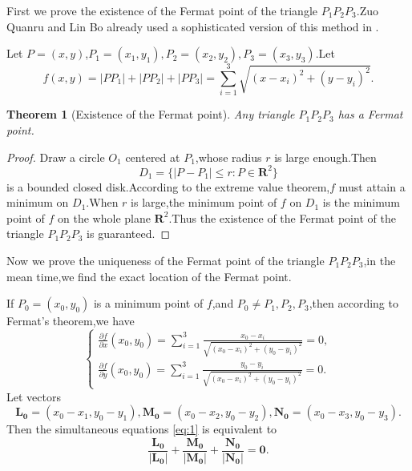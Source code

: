 \documentclass{amsart}
\theoremstyle{plain}
\newtheorem{theorem}{Theorem}
\theoremstyle{definition}
\begin{document}
First we prove the existence of the Fermat point of the triangle
$P_1P_2P_3$.Zuo Quanru and Lin Bo already used a
sophisticated version of this method in \cite{zuo}.

Let $P=(x,y)$,$P_1=(x_1,y_1),P_2=(x_2,y_2),P_3=(x_3,y_3)$.Let 
\begin{equation*}
  f(x,y)=|PP_1|+|PP_2|+|PP_3|=\sum_{i=1}^3\sqrt{(x-x_i)^2+(y-y_i)^2}.
\end{equation*}


\begin{theorem}[Existence of the Fermat point]\label{theorem:3}
  Any triangle $P_1P_2P_3$ has a Fermat point.
\end{theorem}
\begin{proof}
Draw a circle $O_1$ centered at $P_1$,whose radius $r$ is large
enough.Then $$D_{1}=\{|P-P_1|\leq r:P\in \mathbf{R}^2\}$$ is a bounded
closed disk.According to the extreme value theorem,$f$ must
attain a minimum on $D_1$.When $r$ is large,the minimum point of $f$ on
$D_1$ is the minimum point of $f$ on the whole plane $\mathbf{R}^2$.Thus the existence of the Fermat
point of the triangle $P_1P_2P_3$ is guaranteed.
\end{proof}





Now we prove the uniqueness of the Fermat point of the triangle
$P_1P_2P_3$,in the mean time,we find the exact
location of the Fermat point.




If $P_0=(x_0,y_0)$ is a minimum point of $f$,and $P_0\neq P_1,P_2,P_3$,then
according to Fermat's theorem,we have
\begin{equation}\label{eq:1}
  \begin{cases}
          \displaystyle\frac{\partial f}{\partial x}(x_{0},y_{0})=\sum_{i=1}^3
  \frac{x_{0}-x_i}{\sqrt{(x_{0}-x_i)^2+(y_{0}-y_i)^2}}=0,\\
\displaystyle\frac{\partial f}{\partial
    y}(x_{0},y_{0})=\sum_{i=1}^3 \frac{y_{0}-y_i}{\sqrt{(x_{0}-x_i)^2+(y_{0}-y_i)^2}}=0.
  \end{cases}
\end{equation}
Let vectors
$$
\mathbf{L_{0}}=(x_0-x_1,y_0-y_1),\mathbf{M_{0}}=(x_0-x_2,y_0-y_2),\mathbf{N_{0}}=(x_0-x_3,y_0-y_3).
$$
Then the simultaneous equations \eqref{eq:1} is equivalent to
\begin{equation}
  \label{eq:2}
\mathbf{\frac{L_{0}}{|L_{0}|}+\frac{M_{0}}{|M_{0}|}+\frac{N_{0}}{|N_{0}|}}=\mathbf{0}.
\end{equation}
\end{document}
